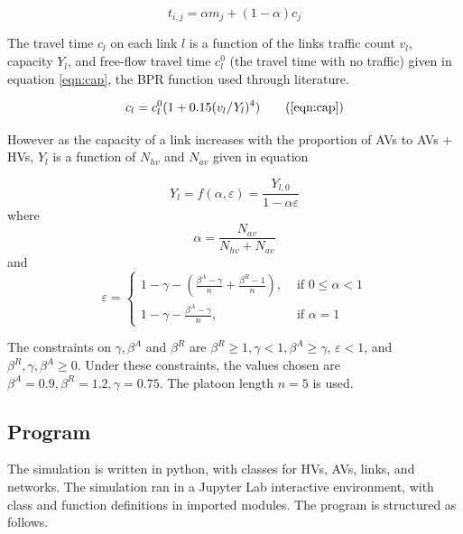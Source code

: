 \documentclass[12pt, a4paper, onecolumn]{article}
\begin{document}
\begin{equation}
	t_{i, j} = \alpha m_{j} + (1-\alpha) c_{j}
	\label{eqn:atis}
	\end{equation}

The travel time $c_{l}$ on each link $l$ is a function of the links traffic count $v_{l}$, capacity $Y_{l}$, and free-flow travel time $c_{l}^{0}$ (the travel time with no traffic) given in equation \ref{eqn:cap}, the BPR function used through literature.

\begin{equation}
	c_{l} = c_{l}^{0}( 1 + 0.15(v_{l}/Y_{l})^{4})
	\tag{\ref{eqn:cap}}
	\end{equation}

However as the capacity of a link increases with the proportion of AVs to AVs + HVs, $Y_{l}$ is a function of $N_{hv}$ and $N_{av}$ given in equation %

\begin{equation}
	Y_{l} = f (\alpha, \varepsilon) = \frac{Y_{l,0}}{1 - \alpha \varepsilon} 
	\label{eqn:capgain2}
	\end{equation}
where
\begin{equation}
	\alpha = \frac{ N_{av}	}{ N_{hv} + N_{av} }
	\label{eqn:avprop}
	\end{equation}
and
\begin{equation}
	\varepsilon = \left\{\begin{array}{ll}
		1 - \gamma - \left(\frac{\beta^{A}-\gamma}{n} + \frac{\beta^{R}-1}{n}\right), & \text { if } 0 \leq \alpha<1 \\
		1-\gamma-\frac{\beta^{A}-\gamma}{n}, & \text { if } \alpha=1
		\end{array}\right.
	\label{eqn:avgain2}
	\end{equation}

The constraints on $\gamma, \beta^{A}$ and $\beta^{R}$ are $\beta^R \geq 1, \gamma < 1, \beta^A \geq \gamma$, $\varepsilon < 1$, and $\beta^R,  \gamma, \beta^A \geq 0$. Under these constraints, the values chosen are $\beta^A = 0.9, \beta^R = 1.2, \gamma = 0.75$. The platoon length $n=5$ is used.


\subsection{Program}
The simulation is written in python, with classes for HVs, AVs, links, and networks. The simulation ran in a Jupyter Lab interactive environment, with class and function definitions in imported modules. The program is structured as follows.
\end{document}
